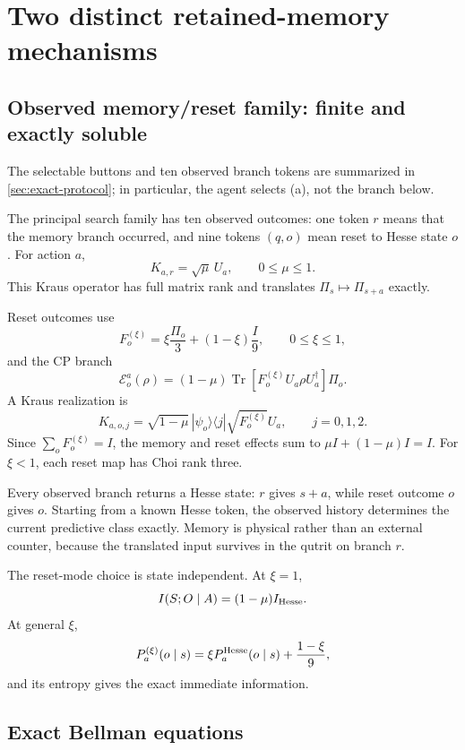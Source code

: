 \documentclass[11pt]{article}
\theoremstyle{definition}
\theoremstyle{remark}
\newcommand{\cE}{\mathcal E}
\newcommand{\Tr}{\operatorname{Tr}}
\begin{document}
\section{Two distinct retained-memory mechanisms}

\subsection{Observed memory/reset family: finite and exactly soluble}
\label{sec:observed}

The selectable buttons and ten observed branch tokens are summarized in
\cref{sec:exact-protocol}; in particular, the agent selects (a), not the
branch below.

The principal search family has ten observed outcomes: one token \(r\) means
that the memory branch occurred, and nine tokens \((q,o)\) mean reset to Hesse
state \(o\). For action \(a\),
\begin{equation}
K_{a,r}=\sqrt\mu\,U_a,\qquad 0\le\mu\le1.
\label{eq:memory}
\end{equation}
This Kraus operator has full matrix rank and translates
\(\Pi_s\mapsto\Pi_{s+a}\) exactly.

Reset outcomes use
\[
F_o^{(\xi)}=\xi\frac{\Pi_o}{3}+(1-\xi)\frac I9,
\qquad 0\le\xi\le1,
\]
and the CP branch
\begin{equation}
\cE_o^a(\rho)=(1-\mu)\Tr[
F_o^{(\xi)}U_a\rho U_a^\dagger]\Pi_o.
\label{eq:reset}
\end{equation}
A Kraus realization is
\[
K_{a,o,j}=\sqrt{1-\mu}\,
|\psi_o\rangle\langle j|\sqrt{F_o^{(\xi)}}U_a,
\qquad j=0,1,2.
\]
Since \(\sum_oF_o^{(\xi)}=I\), the memory and reset effects sum to
\(\mu I+(1-\mu)I=I\). For \(\xi<1\), each reset map has Choi rank three.

Every observed branch returns a Hesse state: \(r\) gives \(s+a\), while
reset outcome \(o\) gives \(o\). Starting from a known Hesse token, the
observed history determines the current predictive class exactly. Memory is
physical rather than an external counter, because the translated input
survives in the qutrit on branch \(r\).

The reset-mode choice is state independent. At \(\xi=1\),
\[
I(S;O\mid A)=(1-\mu)I_{\rm Hesse}.
\]
At general \(\xi\),
\[
P_a^{(\xi)}(o\mid s)
=\xi P_a^{\rm Hesse}(o\mid s)+\frac{1-\xi}{9},
\]
and its entropy gives the exact immediate information.

\subsection{Exact Bellman equations}
\end{document}
